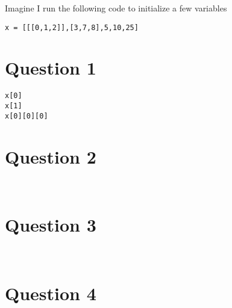 \documentclass{article}
\begin{document}
Imagine I run the following code to initialize a few variables

\begin{lstlisting}
x = [[[0,1,2]],[3,7,8],5,10,25]
\end{lstlisting}

\section*{Question 1}
\begin{lstlisting}
x[0]
x[1]
x[0][0][0]
\end{lstlisting}

\section*{Question 2}
\begin{lstlisting}


\end{lstlisting}
\section*{Question 3}
\begin{lstlisting}


\end{lstlisting}
\section*{Question 4}
\begin{lstlisting}


\end{lstlisting}
\end{document}
